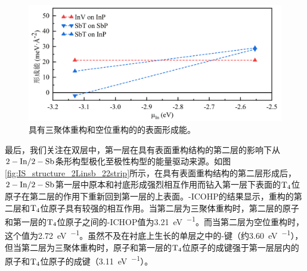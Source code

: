 \begin{figure}[htb]
    \includegraphics{pic/IS_DFT_surfaceE_InVSbT.png}
    \caption{具有三聚体重构和空位重构的的表面形成能。}
    \label{fig:IS_DFT_surfaceE_InVSbT}
\end{figure}

最后，我们关注在双层中，第一层在具有表面重构结构的第二层的影响下从$\rm 2-In/2-Sb$条形构型极化至极性构型的能量驱动来源。如图\ref{fig:IS_structure_2Linsb_22strip}所示，在具有表面重构结构的第二层形成后，$\rm 2-In/2-Sb$第一层中原本和衬底形成强烈相互作用而钻入第一层下表面的$\rm T_{4} \it$位原子在第二层的作用下重新回到第一层的上表面。-ICOHP的结果显示，重构的第二层和$\rm T_{4} \it$位原子具有较强的相互作用。当第二层为三聚体重构时，第二层的原子和第一层的$\rm T_{4} \it$位原子之间的-ICHOP值为\SI{3.21}{\electronvolt\per\pair}。而当第二层为空位重构时，这个值为\SI{2.72}{\electronvolt\per\pair}。虽然不及在衬底上生长的单层之中的-键（约\SI{3.60}{\electronvolt\per\pair}），但当第二层为三聚体重构时，原子和第一层的$\rm T_{4} \it$位原子的成键强于第一层层内的原子和$\rm T_{4} \it$位原子的成键（\SI{3.11}{\electronvolt\per\pair}）。

